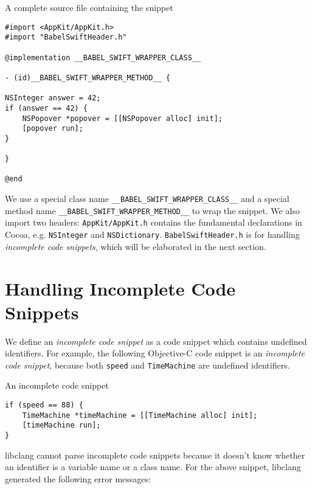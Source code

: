 \documentclass{sfuthesis}
\begin{document}
\begin{listing}
\caption{A complete source file containing the snippet}	
\label{lst:snippet}
\begin{verbatim}
#import <AppKit/AppKit.h>
#import "BabelSwiftHeader.h"

@implementation __BABEL_SWIFT_WRAPPER_CLASS__

- (id)__BABEL_SWIFT_WRAPPER_METHOD__ {

NSInteger answer = 42;
if (answer == 42) {
    NSPopover *popover = [[NSPopover alloc] init];
    [popover run];
}

}

@end
\end{verbatim}
\end{listing}

We use a special class name \texttt{\_\_BABEL\_SWIFT\_WRAPPER\_CLASS\_\_} and a special method name \texttt{\_\_BABEL\_SWIFT\_WRAPPER\_METHOD\_\_} to wrap the snippet. We also import two headers: \texttt{AppKit/AppKit.h} contains the fundamental declarations in Cocoa, e.g. \texttt{NSInteger} and \texttt{NSDictionary}. \texttt{BabelSwiftHeader.h} is for handling \emph{incomplete code snippets}, which will be elaborated in the next section.


\section{Handling Incomplete Code Snippets}

We define an \emph{incomplete code snippet} as a code snippet which contains undefined identifiers. For example, the following Objective-C code snippet is an \emph{incomplete code snippet}, because both \texttt{speed} and \texttt{TimeMachine} are undefined identifiers.

\begin{listing}
\caption{An incomplete code snippet}
\label{lst:incomplete}
\begin{verbatim}
if (speed == 88) {
    TimeMachine *timeMachine = [[TimeMachine alloc] init];
    [timeMachine run];
}
\end{verbatim}
\end{listing}

libclang cannot parse incomplete code snippets because it doesn't know whether an identifier is a variable name or a class name. For the above snippet, libclang generated the following error messages:
\end{document}
